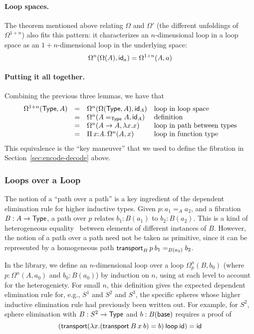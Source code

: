 \paragraph{Loop spaces.}

The theorem mentioned above relating $\Omega$ and $\Omega'$ (the different unfoldings of
$\Omega^{1+n}$) also fits this pattern: it characterizes an
$n$-dimensional loop in a loop space as an $1+n$-dimensional loop in the
underlying space:
\[
\Omega^n(\Omega(A),\mathsf{id}_a) = \Omega^{1+n}(A,a)
\]

\paragraph{Putting it all together.}  Combining the previous three
lemmas, we have that
\[
\begin{array}{rcll}
\Omega^{1+n}(\mathsf{Type},A) & = & 
      \Omega^n(\Omega(\mathsf{Type},A) , \mathsf{id}_A) & \text{loop in loop space} \\
& = & \Omega^n(A =_{\mathsf{Type}} A , \mathsf{id}_A) & \text{definition} \\
& = & \Omega^n(A \to A , \lambda x.x) & \text{loop in path between types}\\
& = & \textnormal{$\Pi$}\,\mathit{x} \mathit{:} \mathit{A}.\,\mathit{} \Omega^n(A, x) & \text{loop in function type}\\
\end{array}
\]
This equivalence is the ``key maneuver'' that we used to define the 
fibration in Section~\ref{sec:encode-decode} above.  

\subsubsection{Loops over a Loop}

The notion of a ``path over a path'' is a key ingredient of the
dependent elimination rule for higher inductive types.  Given $p : a_1
=_A a_2$, and a fibration $B : A \to \mathsf{Type}$, a path over $p$ relates
$b_1 : B(a_1)$ to $b_2 : B(a_2)$.  This is a kind of heterogeneous
equality~\citep{mcbride00thesis} between elements of different instances
of $B$.  However, the notion of a path over a path need not be taken as
primitive, since it can be represented by a homogeneous path
$\mathsf{transport}_B \: p \: b_1 =_{B(a_2)} b_2$.  

In the library, we define an $n$-dimensional loop over a loop
$\Omega^n_p(B,b_0)$ (where $p : \Omega^n(A,a_0)$ and $b_0 : B(a_0)$) by
induction on $n$, using  at each level to account for the
heterogeniety.  For small $n$, this definition gives the expected
dependent elimination rule for, e.g., $S^1$ and $S^2$ and $S^3$, the
specific spheres whose higher inductive elimination rule had previously been written out.  For example, for
$S^2$, sphere elimination with $B : S^2 \to \mathsf{Type}$ and $b :
B(\mathsf{base})$ requires a proof of 
\[
(\mathsf{transport} (\lambda x. (\mathsf{transport} \: B \: x \: b) = b) \: \mathsf{loop} \: \mathsf{id}) = \mathsf{id}
\]

